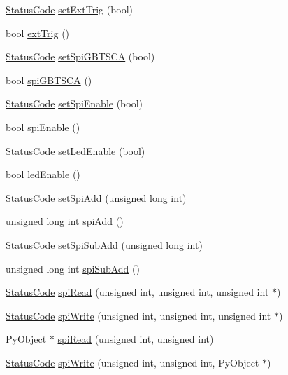 \begin{DoxyCompactItemize}
\item 
\hyperlink{classStatusCode}{Status\+Code} \hyperlink{classSeqPGA_a9744b6cff04738474556cc2153af19de}{set\+Ext\+Trig} (bool)
\item 
bool \hyperlink{classSeqPGA_ae2e0917c379649d106539cc3b8b9ca3c}{ext\+Trig} ()
\item 
\hyperlink{classStatusCode}{Status\+Code} \hyperlink{classSeqPGA_ae5449d6970bffd8de3670a8a1ce6942d}{set\+Spi\+G\+B\+T\+S\+CA} (bool)
\item 
bool \hyperlink{classSeqPGA_a2eadc7868d61ff79ea566b3fbfd977a5}{spi\+G\+B\+T\+S\+CA} ()
\item 
\hyperlink{classStatusCode}{Status\+Code} \hyperlink{classSeqPGA_a39a6cf702c9185793f59a8a05f3a9de7}{set\+Spi\+Enable} (bool)
\item 
bool \hyperlink{classSeqPGA_a6be337fc18199d758430bd178542abb4}{spi\+Enable} ()
\item 
\hyperlink{classStatusCode}{Status\+Code} \hyperlink{classSeqPGA_a2e256a39e1bc4fbfa23de3760a7bd19a}{set\+Led\+Enable} (bool)
\item 
bool \hyperlink{classSeqPGA_a45ec726e141bfef3fa59c4b2d36a0657}{led\+Enable} ()
\item 
\hyperlink{classStatusCode}{Status\+Code} \hyperlink{classSeqPGA_ac998ce3a6d9b5f2e88cc8393f8c1df53}{set\+Spi\+Add} (unsigned long int)
\item 
unsigned long int \hyperlink{classSeqPGA_af31a6428f365c1f8ded0ee381d249cde}{spi\+Add} ()
\item 
\hyperlink{classStatusCode}{Status\+Code} \hyperlink{classSeqPGA_a5db205f213770dd3fb3fcfb8ff7981df}{set\+Spi\+Sub\+Add} (unsigned long int)
\item 
unsigned long int \hyperlink{classSeqPGA_a6422961edd45abad31e6d79e0564c48f}{spi\+Sub\+Add} ()
\item 
\hyperlink{classStatusCode}{Status\+Code} \hyperlink{classSeqPGA_ab3d0e5e5d4014bc7a92588a76b8713d4}{spi\+Read} (unsigned int, unsigned int, unsigned int $\ast$)
\item 
\hyperlink{classStatusCode}{Status\+Code} \hyperlink{classSeqPGA_ad4421841ce4ce8b88ad13f63216f0743}{spi\+Write} (unsigned int, unsigned int, unsigned int $\ast$)
\item 
Py\+Object $\ast$ \hyperlink{classSeqPGA_a61df84df1bd134d1bda2133d82bafb2e}{spi\+Read} (unsigned int, unsigned int)
\item 
\hyperlink{classStatusCode}{Status\+Code} \hyperlink{classSeqPGA_a7b8af951501ccd0f763e131276c543ad}{spi\+Write} (unsigned int, unsigned int, Py\+Object $\ast$)

\end{DoxyCompactItemize}
